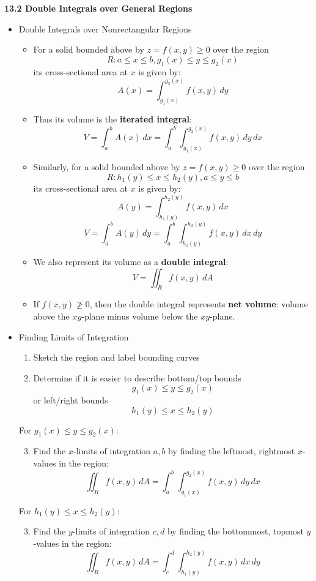 \documentclass[12pt]{article}
\newcommand{\dvar}[1]{\,d{#1}}
\renewcommand{\d}[1]{\dvar{#1}}
\newcommand{\<}{\left<}
\renewcommand{\>}{\right>}
\begin{document}
  \newpage
  
  \centerline{\bf 13.2 Double Integrals over General Regions}
  
  \begin{itemize}
  
  \item Double Integrals over Nonrectangular Regions
  
    \begin{itemize}
    \item For a solid bounded above by $z=f(x,y)\geq 0$ over the region \[R: a\leq x\leq b, g_1(x)\leq y\leq g_2(x)\] its cross-sectional area at $x$ is given by:
      \[
        A(x) = \int_{g_1(x)}^{g_2(x)} f(x,y)\d{y}
      \]
    \item Thus its volume is the \textbf{iterated integral}:
      \[
        V = \int_a^b A(x)\d{x} = \int_a^b\int_{g_1(x)}^{g_2(x)} f(x,y)\d{y}\d{x}
      \]
    \item Similarly, for a solid bounded above by $z=f(x,y)\geq 0$ over the region \[R: h_1(y)\leq x\leq h_2(y), a\leq y\leq b\] its cross-sectional area at $x$ is given by:
      \[
        A(y) = \int_{h_1(y)}^{h_2(y)} f(x,y)\d{x}
      \]
      \[
        V = \int_a^b A(y)\d{y} = \int_a^b\int_{h_1(y)}^{h_2(y)} f(x,y)\d{x}\d{y}
      \]
    \item We also represent its volume as a \textbf{double integral}:
      \[
        V = \iint_R f(x,y)\d{A}
      \]
    \item If $f(x,y)\not\geq 0$, then the double integral represents \textbf{net volume}: volume above the $xy$-plane minus volume below the $xy$-plane.
    \end{itemize}

  \newpage

  \item Finding Limits of Integration
      \begin{enumerate}
      \item Sketch the region and label bounding curves
      \item Determine if it is easier to describe bottom/top bounds \[g_1(x)\leq y\leq g_2(x)\] or left/right bounds \[h_1(y)\leq x\leq h_2(y)\]
      \end{enumerate}
      For $g_1(x)\leq y\leq g_2(x)$:
      \begin{enumerate}
      \setcounter{enumi}{2}
      \item Find the $x$-limits of integration $a,b$ by finding the leftmost, rightmost $x$-values in the region:
        \[
          \iint_R f(x,y)\d{A} = \int_a^b\int_{g_1(x)}^{g_2(x)}f(x,y)\d{y}\d{x}
        \]
      \end{enumerate}
      For $h_1(y)\leq x\leq h_2(y)$:
      \begin{enumerate}
      \setcounter{enumi}{2}
      \item Find the $y$-limits of integration $c,d$ by finding the bottommost, topmost $y$-values in the region:
        \[
          \iint_R f(x,y)\d{A} = \int_c^d\int_{h_1(y)}^{h_2(y)}f(x,y)\d{x}\d{y}
        \]
      \end{enumerate}
  

\end{itemize}
\end{document}
